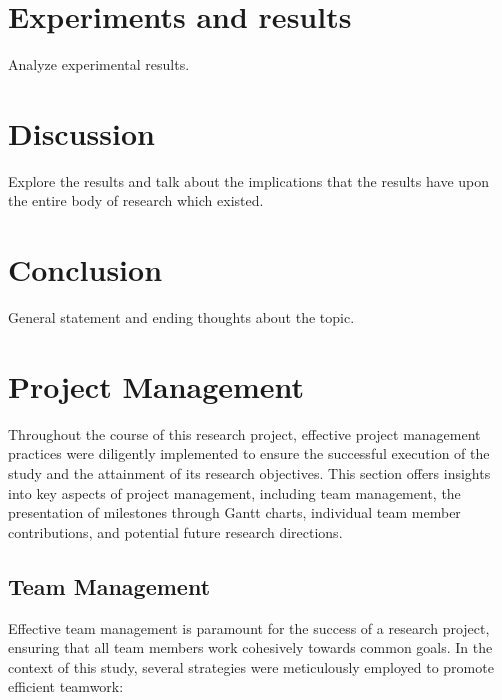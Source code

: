 \documentclass[conference]{IEEEtran}
\begin{document}
\section{Experiments and results}


Analyze experimental results. 
\section{Discussion}
Explore the results and talk about the implications that the results have upon the entire body of research which existed. 

\section{Conclusion}
General statement and ending thoughts about the topic. 


\section{Project Management}

Throughout the course of this research project, effective project management practices were diligently implemented to ensure the successful execution of the study and the attainment of its research objectives. This section offers insights into key aspects of project management, including team management, the presentation of milestones through Gantt charts, individual team member contributions, and potential future research directions.

\subsection{Team Management}
Effective team management is paramount for the success of a research project, ensuring that all team members work cohesively towards common goals. In the context of this study, several strategies were meticulously employed to promote efficient teamwork:
\end{document}
